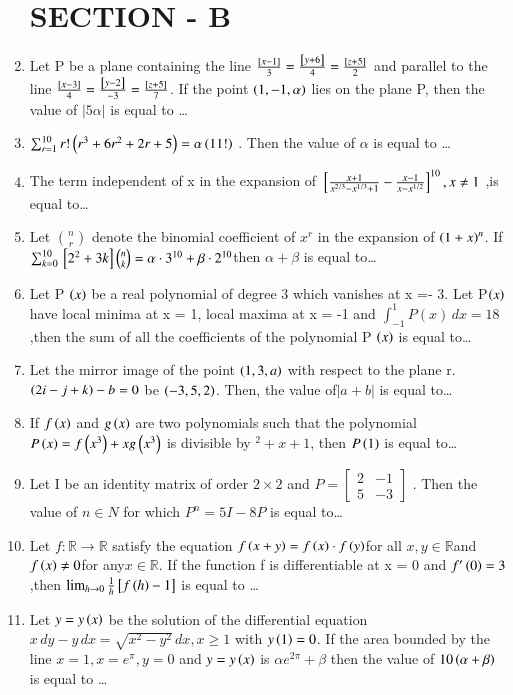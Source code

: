 \documentclass[journal,12pt,twocolumn]{IEEEtran}
\theoremstyle{remark}
\begin{document}
\begin{enumerate}[start=16]
\section{SECTION - B}
\item Let P be a plane containing the line $
\frac{{}\left[x - 1\right]}{3} = \frac{{}\left[y + 6\right]}{4} = \frac{{}\left[z + 5\right]}{2} $ and parallel to the line $
\frac{{}\left[x - 3\right]}{4} = \frac{{}\left[y - 2\right]}{-3} = \frac{{}\left[z + 5\right]}{7} $. If the point $\left(1,-1,\alpha\right)$ lies on the plane P, then the value of $|5\alpha|$ is equal to \dots
\item $\sum_{r=1}^{10} r!\left( r^3 + 6r^2 + 2r + 5 \right) = \alpha \left(11!\right)$ . Then the value of $\alpha$ is equal to \dots
\item The term independent of x in the expansion of $
{}\left[ \frac{x + 1}{x^{2/3} - x^{1/3} + 1} - \frac{x - 1}{x - x^{1/2}} \right]^{10} , x \neq 1$ ,is equal to\dots
\item  Let $ \binom{n}{r} $ denote the binomial coefficient of $ x^r $ in the expansion of $ \left(1+x\right)^n $. If $    \sum_{k=0}^{10} {}\left[2^2 + 3k\right] \binom{n}{k} = \alpha \cdot 3^{10} + \beta \cdot 2^{10}$then $\alpha + \beta$ is equal to\dots
\item  Let P $\left(x\right)$ be a real polynomial of degree 3 which vanishes at x =- 3. Let P$\left(x\right)$ have local minima at x = 1, local maxima at x = -1 and $\int_{-1}^{1} P(x) \, dx = 18$,then the sum of all the coefficients of the polynomial P $\left(x\right)$ is equal to\dots
\item   Let the mirror image of the point $\left(1, 3, a\right)$ with respect to the plane r. $\left(2i - j + k\right) - b = 0$ be $\left(-3, 5, 2\right)$. Then, the value of$ |a + b|$ is equal to\dots
\item If $f\left(x\right)$ and $g\left(x\right)$ are two polynomials such that the polynomial $P \left(x\right) = f \left(x^3\right) + x g \left(x^3\right)$ is divisible by $^2 + x + 1$, then $P \left(1\right)$ is equal to\dots
\item  Let I be an identity matrix of order $2 \times 2$  and $
P = \begin{bmatrix} 
2 & -1 \\ 
5 & -3 
\end{bmatrix}
$ . Then the value of $n\in N$ for which $P^n=5I-8P$ is equal to\dots
\item Let  $f : \mathbb{R} \to \mathbb{R}$ satisfy the equation 
$
f\left(x + y\right) = f\left(x\right) \cdot f\left(y\right)$for all $x, y \in \mathbb{R} $and $ f\left(x\right) \neq 0 $for any$ x \in \mathbb{R}
$. If the function f is differentiable at x = 0 and $f'\left(0\right)=3$,then $
\lim_{h \to 0} \frac{1}{h}  {}\left[f\left(h\right) - 1 \right]$ is equal to \dots
\item Let $y = y \left(x\right)$ be the solution of the differential equation $x \, dy - y \, dx = \sqrt{x^2 - y^2} \, dx, x \geq 1
$ with $y\left(1\right)=0$. If the area bounded by the line $x = 1, x = e^\pi, y = 0$ and $y = y\left(x\right)$ is $ \alpha e^{2\pi} + \beta $ then the value of $10 \left(\alpha + \beta\right)$ is equal to \dots







\end{enumerate}
\end{document}
